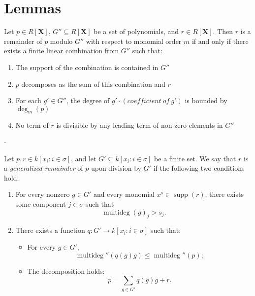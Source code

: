 \chapter{Lemmas}

\begin{lemma}\label{zero_le}

  \leanok

\end{lemma}

\begin{lemma}\label{IsRemainder_def'}
  \leanok
  Let $p \in R[\mathbf{X}]$, $G'' \subseteq R[\mathbf{X}]$ be a set of polynomials,
and $r \in R[\mathbf{X}]$. Then $r$ is a remainder of $p$ modulo $G''$ with respect to
monomial order $m$ if and only if there exists a finite linear combination from $G''$
such that:
\begin{enumerate}
\item The support of the combination is contained in $G''$
\item $p$ decomposes as the sum of this combination and $r$
\item For each $g' \in G''$, the degree of $g' \cdot (coefficient\ of\ g')$
  is bounded by $\deg_m(p)$
\item No term of $r$ is divisible by any leading term of non-zero elements in $G''$
\end{enumerate}
-
\end{lemma}

\begin{lemma}\label{IsRemainder_def''}
  \leanok
  Let \( p, r \in k[x_i : i \in \sigma] \), and let \( G' \subseteq k[x_i : i \in \sigma] \) be a finite set.
We say that \( r \) is a \emph{generalized remainder} of \( p \) upon division by \( G' \) if the following two conditions hold:

\begin{enumerate}
\item For every nonzero \( g \in G' \) and every monomial \( x^s \in \operatorname{supp}(r) \),
there exists some component \( j \in \sigma \) such that
\[
\operatorname{multideg}(g)_j > s_j.
\]
\item There exists a function \( q : G' \to k[x_i : i \in \sigma] \) such that:
\begin{itemize}
\item For every \( g \in G' \),
  \[
  \operatorname{multideg}''(q(g)g) \leq \operatorname{multideg}''(p);
  \]
\item The decomposition holds:
  \[
  p = \sum_{g \in G'} q(g)g + r.
  \]
\end{itemize}
\end{enumerate}

\end{lemma}

